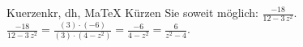 \begin{MAufgabe}{Kuerzen}{kr, dh, MaTeX}
K\"urzen Sie soweit m\"oglich: $\frac{-18}{12 - 3\, z^2}$.\\ 
\ifLsg\MLoesung
\quad $\frac{-18}{12 - 3\, z^2}=\frac{(3)\cdot(-6)}{(3)\cdot(4 - z^2)}=\frac{-6}{4 - z^2}=\frac{6}{z^2 - 4}$.\else\relax\fi
 \end{MAufgabe}